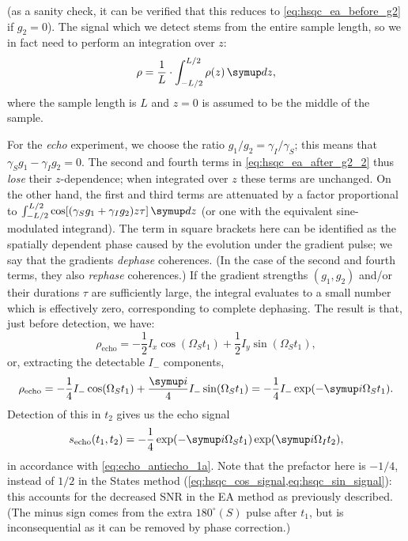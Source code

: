 (as a sanity check, it can be verified that this reduces to \cref{eq:hsqc_ea_before_g2} if $g_2 = 0$).
The signal which we detect stems from the entire sample length, so we in fact need to perform an integration over $z$:
\begin{equation}
    \label{eq:density_operator_integration}
    \rho = \frac{1}{L} \cdot \int_{-L/2}^{L/2} \rho(z) \,\md z,
\end{equation}
where the sample length is $L$ and $z=0$ is assumed to be the middle of the sample.

For the \textit{echo} experiment, we choose the ratio $g_1/g_2 = \gamma_I/\gamma_S$; this means that $\gamma_S g_1 - \gamma_I g_2 = 0$.
The second and fourth terms in \cref{eq:hsqc_ea_after_g2_2} thus \textit{lose} their $z$-dependence; when integrated over $z$ these terms are unchanged.
On the other hand, the first and third terms are attenuated by a factor proportional to $\int_{-L/2}^{L/2} \cos[(\gamma_S g_1 + \gamma_I g_2)z\tau]\,\md z$ (or one with the equivalent sine-modulated integrand).
The term in square brackets here can be identified as the spatially dependent phase caused by the evolution under the gradient pulse; we say that the gradients \textit{dephase} coherences. (In the case of the second and fourth terms, they also \textit{rephase} coherences.)
If the gradient strengths $(g_1, g_2)$ and/or their durations $\tau$ are sufficiently large, the integral evaluates to a small number which is effectively zero, corresponding to complete dephasing.
The result is that, just before detection, we have:
\begin{equation}
    \label{eq:hsqc_ea_echo_cartesian}
    \rho_\text{echo} = -\frac{1}{2}I_x\cos(\Omega_S t_1) + \frac{1}{2}I_y\sin(\Omega_S t_1),
\end{equation}
or, extracting the detectable $I_-$ components,
\begin{equation}
    \label{eq:hsqc_ea_echo_detectable}
    \rho_\text{echo} = -\frac{1}{4}I_-\cos(\Omega_S t_1) + \frac{\mi}{4}I_-\sin(\Omega_S t_1) = -\frac{1}{4}I_-\exp(-\mi\Omega_S t_1).
\end{equation}
Detection of this in $t_2$ gives us the echo signal
\begin{equation}
    \label{eq:hsqc_ea_echo_signal}
    s_\text{echo}(t_1, t_2) = -\frac{1}{4}\exp(-\mi \Omega_S t_1)\exp(\mi \Omega_I t_2),
\end{equation}
in accordance with \cref{eq:echo_antiecho_1a}.
Note that the prefactor here is $-1/4$, instead of $1/2$ in the States method (\cref{eq:hsqc_cos_signal,eq:hsqc_sin_signal}): this accounts for the decreased SNR in the EA method as previously described.
(The minus sign comes from the extra $180^\circ(S)$ pulse after $t_1$, but is inconsequential as it can be removed by phase correction.)

